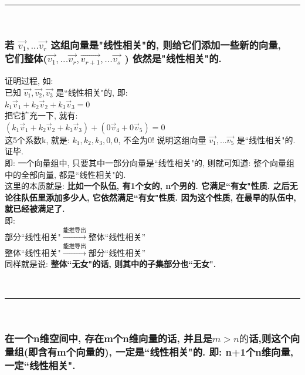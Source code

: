 \documentclass[UTF8]{ctexart}
\begin{document}
~\\
\hrule
~\\

\subsubsection{若 $\vec{v_1}, ... \vec{v_r}$ 这组向量是"线性相关"的, 则给它们添加一些新的向量, \\它们整体($\vec{v_1}, ... \vec{v_r}, \vec{v_{r+1}}, ... \vec{v_s}$ ) 依然是"线性相关"的.}

证明过程, 如: \\
已知 $\vec{v_1}, \vec{v_2}, \vec{v_3}$ 是``线性相关"的, 即: \\
$k_1\vec{v}_1+k_2\vec{v}_2+k_3\vec{v}_3=0 $\\

把它扩充一下, 就有:\\
$(k_1\vec{v}_1+k_2\vec{v}_2+k_3\vec{v}_3) +(0\vec{v}_4+0\vec{v}_5)=0$\\

这5个系数k, 就是: $k_1, k_2, k_3, 0, 0$, 不全为0! 说明这组向量 $\vec{v_1}, ... \vec{v_5}$ 是``线性相关"的. 证毕.\\

即: 一个向量组中, 只要其中一部分向量是``线性相关"的, 则就可知道: 整个向量组中的全部向量, 都是``线性相关"的.\\
这里的本质就是: \textbf{比如一个队伍, 有1个女的, n个男的. 它满足``有女"性质. 之后无论往队伍里添加多少人, 它依然满足``有女"性质. 因为这个性质, 在最早的队伍中, 就已经被满足了.}\\


即:\\
部分``线性相关"$\overset{\text{能推导出}}{\rightarrow}$整体``线性相关'' \\
整体``线性相关"$\overset{\text{能推导出}}{\rightarrow}$部分``线性相关'' \\

同样就是说: \textbf{整体``无女"的话, 则其中的子集部分也``无女".}



~\\
\hrule
~\\

\subsubsection{在一个n维空间中, 存在m个n维向量的话, 并且是$m>n的$话,则这个向量组(即含有m个向量的), 一定是``线性相关"的. 即: n+1个n维向量, 一定``线性相关".}
\end{document}
